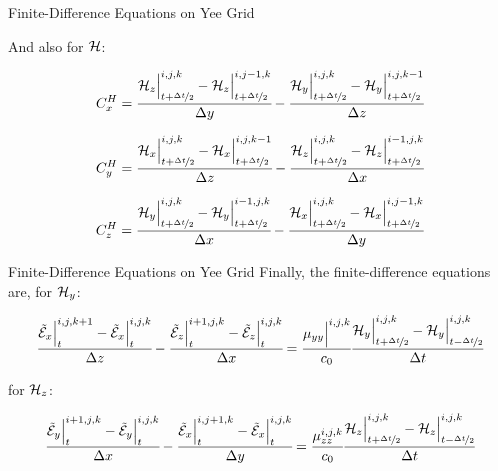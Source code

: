 \documentclass[aspectratio=169]{beamer}
\begin{document}
\begin{frame}{Finite-Difference Equations on Yee Grid}
  
  And also for $\mathcal{H}$:

  \begin{align}
      C_x^H = \cfrac{\mathcal{H}_z\Big|^{i,j,k}_{t+\nicefrac{\Delta t}{2}}-\mathcal{H}_z\Big|^{i,j-1,k}_{t+\nicefrac{\Delta t}{2}}}{\Delta y} - \cfrac{\mathcal{H}_y\Big|^{i,j,k}_{t+\nicefrac{\Delta t}{2}}-\mathcal{H}_y\Big|^{i,j,k-1}_{t+\nicefrac{\Delta t}{2}}}{\Delta z}
      \label{eq:CHx}
  \end{align}
  
  
  \begin{align}
      C_y^H = \cfrac{\mathcal{H}_x\Big|^{i,j,k}_{t+\nicefrac{\Delta t}{2}}-\mathcal{H}_x\Big|^{i,j,k-1}_{t+\nicefrac{\Delta t}{2}}}{\Delta z} - \cfrac{\mathcal{H}_z\Big|^{i,j,k}_{t+\nicefrac{\Delta t}{2}}-\mathcal{H}_z\Big|^{i-1,j,k}_{t+\nicefrac{\Delta t}{2}}}{\Delta x}
      \label{eq:CHy}
  \end{align}
  
  
  \begin{align}
      C_z^H = \cfrac{\mathcal{H}_y\Big|^{i,j,k}_{t+\nicefrac{\Delta t}{2}}-\mathcal{H}_y\Big|^{i-1,j,k}_{t+\nicefrac{\Delta t}{2}}}{\Delta x} - \cfrac{\mathcal{H}_x\Big|^{i,j,k}_{t+\nicefrac{\Delta t}{2}}-\mathcal{H}_x\Big|^{i,j-1,k}_{t+\nicefrac{\Delta t}{2}}}{\Delta y}
      \label{eq:CHz}
  \end{align}

\end{frame}

\begin{frame}{Finite-Difference Equations on Yee Grid}
  Finally, the finite-difference equations are, for $\mathcal{H}_y$:

\begin{align}
    \cfrac{\tilde{\mathcal{E}}_x\Big|^{i,j,k+1}_{t}-\tilde{\mathcal{E}}_x\Big|^{i,j,k}_{t}}{\Delta z} - \cfrac{\tilde{\mathcal{E}}_z\Big|^{i+1,j,k}_{t}-\tilde{\mathcal{E}}_z\Big|^{i,j,k}_{t}}{\Delta x}=\cfrac{\mu_{yy}\Big|^{i,j,k}}{c_0}\cfrac{\mathcal{H}_y\Big|^{i,j,k}_{t+\nicefrac{\Delta t}{2}} - \mathcal{H}_y\Big|^{i,j,k}_{t-\nicefrac{\Delta t}{2}}}{\Delta t}
    \label{eq:fd_hy}
\end{align}

for $\mathcal{H}_z$:

\begin{align}
    \cfrac{\tilde{\mathcal{E}}_y\Big|^{i+1,j,k}_{t}-\tilde{\mathcal{E}}_y\Big|^{i,j,k}_{t}}{\Delta x} - \cfrac{\tilde{\mathcal{E}}_x\Big|^{i,j+1,k}_{t}-\tilde{\mathcal{E}}_x\Big|^{i,j,k}_{t}}{\Delta y} = \cfrac{\mu_{zz}^{i,j,k}}{c_0}\cfrac{\mathcal{H}_z\Big|^{i,j,k}_{t+\nicefrac{\Delta t}{2}} - \mathcal{H}_z\Big|^{i,j,k}_{t-\nicefrac{\Delta t}{2}}}{\Delta t}
    \label{eq:fd_hz}
\end{align}



\end{frame}
\end{document}
